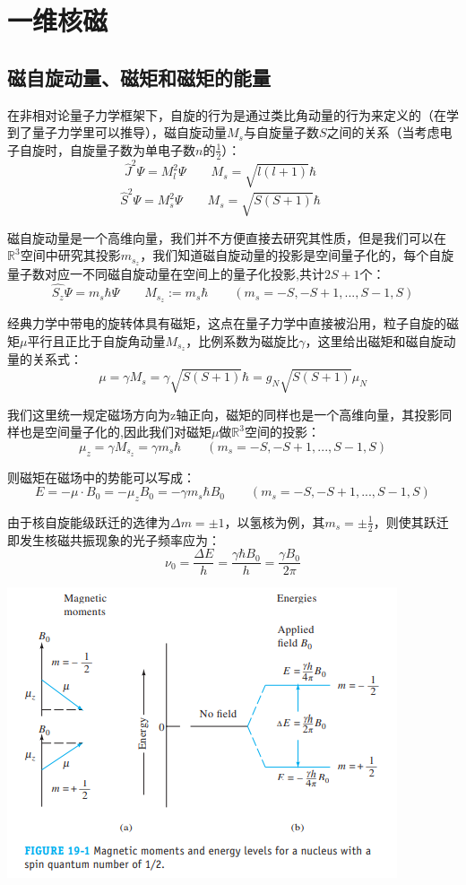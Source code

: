 \section{一维核磁}
\subsection{磁自旋动量、磁矩和磁矩的能量}

在非相对论量子力学框架下，自旋的行为是通过类比角动量的行为来定义的（在学到了量子力学里可以推导），磁自旋动量$M_s$与自旋量子数$S$之间的关系（当考虑电子自旋时，自旋量子数为单电子数$n$的$\frac{1}{2}$）：
\[\hat{J}^2 \varPsi = M_l^2 \varPsi \qquad M_s=\sqrt{l(l+1)} \hbar \qquad\]
\[\hat{S}^2 \varPsi = M_s^2 \varPsi \qquad M_s=\sqrt{S(S+1)} \hbar \qquad\]

磁自旋动量是一个高维向量，我们并不方便直接去研究其性质，但是我们可以在$\mathbb{R}^3$空间中研究其投影$m_{s_z}$，我们知道磁自旋动量的投影是空间量子化的，每个自旋量子数对应一不同磁自旋动量在空间上的量子化投影,共计$2S+1$个：
\[\hat{S_z} \varPsi =m_s \hbar \varPsi \qquad M_{s_z}:=m_s \hbar \qquad (m_s=-S,-S+1,...,S-1,S)\]

经典力学中带电的旋转体具有磁矩，这点在量子力学中直接被沿用，粒子自旋的磁矩$\mu$平行且正比于自旋角动量$M_{s_z}$，比例系数为磁旋比$\gamma$，这里给出磁矩和磁自旋动量的关系式：
\[\mu=\gamma M_s=\gamma \sqrt{S(S+1)} \hbar= g_N \sqrt{S(S+1)}  \mu_N\]

我们这里统一规定磁场方向为z轴正向，磁矩的同样也是一个高维向量，其投影同样也是空间量子化的,因此我们对磁矩$\mu$做$\mathbb{R}^3$空间的投影：
\[\mu_z=\gamma M_{s_z}=\gamma m_s \hbar \qquad (m_s=-S,-S+1,...,S-1,S)\]

则磁矩在磁场中的势能可以写成：
\[E=-\mu \cdot B_0=-\mu_zB_0=-\gamma m_s \hbar B_0 \qquad  (m_s=-S,-S+1,...,S-1,S)\]

由于核自旋能级跃迁的选律为$\Delta m= \pm 1$，以氢核为例，其$m_s= \pm \frac{1}{2}$，则使其跃迁即发生核磁共振现象的光子频率应为：
\[\nu_0 = \frac{\Delta E}{h}=\frac{\gamma \hbar B_0}{h}=\frac{\gamma B_0}{2\pi} \tag{a}\]

\begin{center}
\includegraphics[scale=0.8]{./fig/hc/hc1.png}
\end{center}

